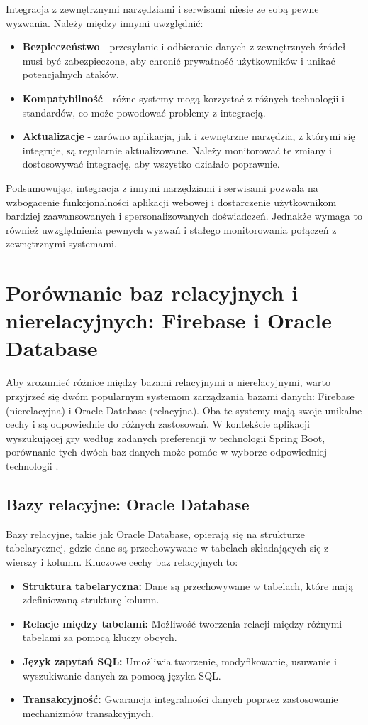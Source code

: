 Integracja z zewnętrznymi narzędziami i serwisami niesie ze sobą pewne wyzwania. Należy między innymi uwzględnić:
\begin{itemize}
\item \textbf{Bezpieczeństwo} - przesyłanie i odbieranie danych z zewnętrznych źródeł musi być zabezpieczone, aby chronić prywatność użytkowników i unikać potencjalnych ataków.
\item \textbf{Kompatybilność} - różne systemy mogą korzystać z różnych technologii i standardów, co może powodować problemy z integracją.
\item \textbf{Aktualizacje} - zarówno aplikacja, jak i zewnętrzne narzędzia, z którymi się integruje, są regularnie aktualizowane. Należy monitorować te zmiany i dostosowywać integrację, aby wszystko działało poprawnie.
\end{itemize}
Podsumowując, integracja z innymi narzędziami i serwisami pozwala na wzbogacenie funkcjonalności aplikacji webowej i dostarczenie użytkownikom bardziej zaawansowanych i spersonalizowanych doświadczeń. Jednakże wymaga to również uwzględnienia pewnych wyzwań i stałego monitorowania połączeń z zewnętrznymi systemami.

\section{Porównanie baz relacyjnych i nierelacyjnych: Firebase i Oracle Database}

Aby zrozumieć różnice między bazami relacyjnymi a nierelacyjnymi, warto przyjrzeć się dwóm popularnym systemom zarządzania bazami danych: Firebase (nierelacyjna) i Oracle Database (relacyjna). Oba te systemy mają swoje unikalne cechy i są odpowiednie do różnych zastosowań. W kontekście aplikacji wyszukującej gry według zadanych preferencji w technologii Spring Boot, porównanie tych dwóch baz danych może pomóc w wyborze odpowiedniej technologii \cite{diffs}.

\subsection{Bazy relacyjne: Oracle Database}

Bazy relacyjne, takie jak Oracle Database, opierają się na strukturze tabelarycznej, gdzie dane są przechowywane w tabelach składających się z wierszy i kolumn. Kluczowe cechy baz relacyjnych to:

\begin{itemize}
\item \textbf{Struktura tabelaryczna:} Dane są przechowywane w tabelach, które mają zdefiniowaną strukturę kolumn.
\item \textbf{Relacje między tabelami:} Możliwość tworzenia relacji między różnymi tabelami za pomocą kluczy obcych.
\item \textbf{Język zapytań SQL:} Umożliwia tworzenie, modyfikowanie, usuwanie i wyszukiwanie danych za pomocą języka SQL.
\item \textbf{Transakcyjność:} Gwarancja integralności danych poprzez zastosowanie mechanizmów transakcyjnych\cite{oracleDb}.
\end{itemize}

